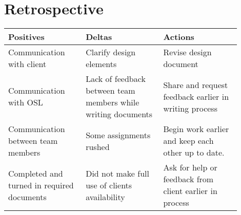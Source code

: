 \documentclass[10pt,onecolumn,journal,draftclsnofoot]{IEEEtran}
\begin{document}
\section{Retrospective}
\begin{center}
	\begin{tabular}{| p{0.3\linewidth} | p{0.3\linewidth} | p{0.3\linewidth} |}\hline
		Positives & Deltas & Actions \\ \hline
		Communication with client & Clarify design elements 	& Revise design document \\ \hline
		Communication with OSL & Lack of feedback between team members while writing documents & Share and request feedback earlier in writing process \\ \hline
		Communication between team members	& Some assignments rushed & Begin work earlier and keep each other up to date. \\ \hline
		Completed and turned in required documents & Did not make full use of clients availability & Ask for help or feedback from client earlier in process \\ \hline
	\end{tabular}
\end{center}
\end{document}
